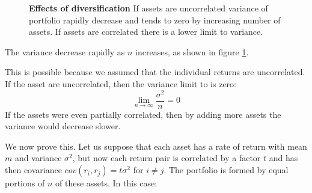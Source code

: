\begin{figure}
    \centering
    \qquad
    \caption[Effects of diversification]{\textbf{Effects of diversification} If assets are uncorrelated variance of portfolio rapidly decrease and tends to zero by increasing number of assets. If assets are correlated there is a lower limit to variance.}
    \label{fig:portfolio_variance_assets}
\end{figure}

The variance decrease rapidly as $n$ increases, as shown in figure \ref{fig:portfolio_variance_assets}.

This is possible because we assumed that the individual returns are uncorrelated. If the asset are uncorrelated, then the variance limit to is zero:
$$ \lim_{n \rightarrow \infty} \frac{\sigma^2}{n} = 0 $$ If the assets were even partially correlated, then by adding more assets the variance would decrease slower. 

We now prove this. Let us suppose that each asset has a rate of return with mean $m$ and variance $\sigma^2$, but now each return pair is correlated by a factor $t$ and has then covariance $cov(r_i,r_j)=t \sigma^2$ for $i \neq j$. The portfolio is formed by equal portions of $n$ of these assets. In this case:

